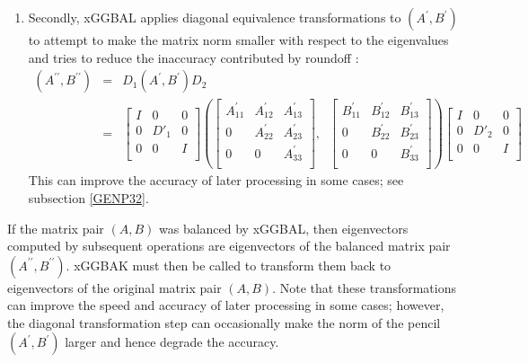 \begin{enumerate}
\item Secondly, xGGBAL applies diagonal equivalence transformations
      to $(A^\prime,B^\prime)$ to attempt to make the matrix norm smaller
      with respect
      to the eigenvalues and tries to reduce the inaccuracy contributed by
      roundoff \cite{ward81}:
      \begin{eqnarray*}
      (A^{\prime\prime},B^{\prime\prime}) & =  &
              D_1(A^\prime,B^\prime)D_2  \\
       & = &
      \left[ \begin{array}{ccc}
          I &    0   & 0 \\
          0 & D'_1 & 0 \\
          0 &    0   & I \\ \end{array} \right] \left(
       \left[
      \begin{array}{ccc}
          A^\prime_{11} & A^\prime_{12} & A^\prime_{13} \\
          0             & A^\prime_{22} & A^\prime_{23} \\
          0             &      0        & A^\prime_{33} \\ \end{array}
       \right] , \;\;
       \left[
      \begin{array}{ccc}
          B^\prime_{11} & B^\prime_{12} & B^\prime_{13} \\
          0             & B^\prime_{22} & B^\prime_{23} \\
          0             &      0        & B^\prime_{33} \\
      \end{array} \right] \right) \left[
      \begin{array}{ccc}
          I &    0   & 0 \\
          0 & D'_2 & 0 \\
          0 &    0   & I \\ \end{array} \right]
      \end{eqnarray*}
      This can improve the accuracy of later processing in some cases; see
      subsection \ref{GENP32}.

\end{enumerate}

If the matrix pair $(A,B)$ was balanced by xGGBAL, then eigenvectors
computed by subsequent operations are eigenvectors of the balanced
matrix pair $(A^{\prime\prime},B^{\prime\prime})$. xGGBAK
must then
be called to transform them back to eigenvectors of the original matrix
pair $(A,B)$.
Note that these transformations can improve the speed and accuracy of
later processing in some cases; however, the diagonal transformation
step can occasionally make the norm of the pencil $(A^\prime,B^\prime)$ larger
and hence degrade the accuracy.

